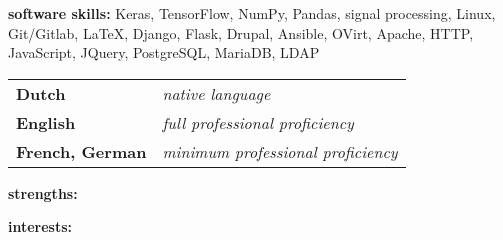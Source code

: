
\divider

\textbf{software skills:}
Keras,
TensorFlow,
NumPy,
Pandas,
signal processing,
Linux,
Git/Gitlab,
\LaTeX,
Django,
Flask,
Drupal,
Ansible,
OVirt,
Apache,
HTTP,
JavaScript,
JQuery,
PostgreSQL,
MariaDB,
LDAP

\divider

\begin{tabular}{p{2.5cm} p{4cm}}
\textbf{Dutch} & \textit{native language} \\
\textbf{English} & \textit{full professional proficiency}\\
\textbf{French, German} &\textit{minimum professional \newline proficiency}
\end{tabular}


\textbf{strengths:} \smallskip  \newline
{}

\divider

\textbf{interests:} \smallskip \newline
{}


